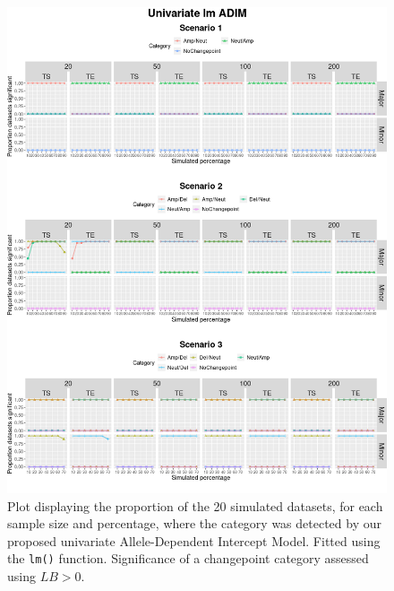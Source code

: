 \vfill 
\begin{figure}[!htb]
\center
\includegraphics[width = 1\textwidth]{../figures/Chapter_5/lm_uni_sim_plot.png}
\caption[Plot displaying the proportion of the 20 simulated datasets, for each sample size and percentage, where the category was detected by our proposed univariate Allele-Dependent Intercept Model (\texttt{lm()}).]{Plot displaying the proportion of the 20 simulated datasets, for each sample size and percentage, where the category was detected by our proposed univariate Allele-Dependent Intercept Model. Fitted using the \texttt{lm()} function. Significance of a changepoint category assessed using $LB > 0$.}
\label{fig:Uni_lm_SimStudy}
\end{figure}


